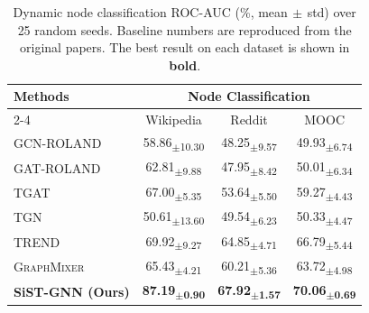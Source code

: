 \begin{table}[t]
\centering
\caption{Dynamic node classification ROC-AUC (\%, mean$\,\pm\,$std)
over 25 random seeds. Baseline numbers are reproduced from the original
papers. The best result on each dataset is shown in \textbf{bold}.}
\label{tab:nc_results}
\begin{tabular}{lccc}
\toprule
\multirow{2}{*}{Methods} & \multicolumn{3}{c}{Node Classification} \\
\cmidrule(lr){2-4}
 & Wikipedia & Reddit & MOOC \\
\midrule
\textsc{GCN-ROLAND} & 58.86\textsubscript{$\pm$10.30} & 48.25\textsubscript{$\pm$9.57} & 49.93\textsubscript{$\pm$6.74} \\
\textsc{GAT-ROLAND} & 62.81\textsubscript{$\pm$9.88} & 47.95\textsubscript{$\pm$8.42} & 50.01\textsubscript{$\pm$6.34} \\
\textsc{TGAT} & 67.00\textsubscript{$\pm$5.35} & 53.64\textsubscript{$\pm$5.50} & 59.27\textsubscript{$\pm$4.43} \\
\textsc{TGN} & 50.61\textsubscript{$\pm$13.60} & 49.54\textsubscript{$\pm$6.23} & 50.33\textsubscript{$\pm$4.47} \\
\textsc{TREND} & 69.92\textsubscript{$\pm$9.27} & 64.85\textsubscript{$\pm$4.71} & 66.79\textsubscript{$\pm$5.44} \\
\textsc{GraphMixer} & 65.43\textsubscript{$\pm$4.21} & 60.21\textsubscript{$\pm$5.36} & 63.72\textsubscript{$\pm$4.98} \\
\midrule
\textbf{SiST-GNN (Ours)} & \textbf{87.19\textsubscript{$\pm$0.90}} & \textbf{67.92\textsubscript{$\pm$1.57}} & \textbf{70.06\textsubscript{$\pm$0.69}} \\
\bottomrule
\end{tabular}
\end{table}
